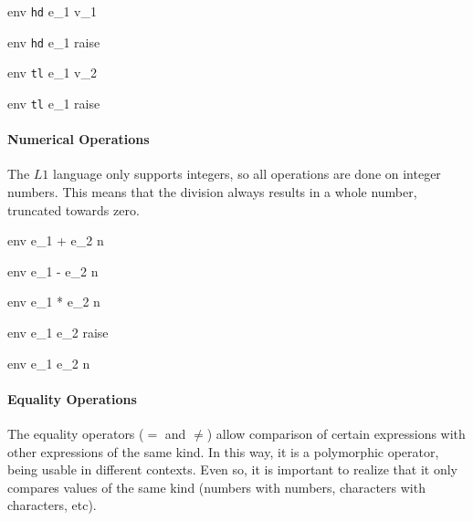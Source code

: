 \documentclass{article}
\begin{document}
    {\mbox{env} \vdash \texttt{hd} \; e_1 \Downarrow v_1}

    {\mbox{env} \vdash \texttt{hd} \; e_1 \Downarrow raise}

    {\mbox{env} \vdash \texttt{tl} \; e_1 \Downarrow v_2}

    {\mbox{env} \vdash \texttt{tl} \; e_1 \Downarrow raise}


\paragraph{Numerical Operations}
The $L1$ language only supports integers, so all operations are done on integer numbers.
This means that the division always results in a whole number, truncated towards zero.

\medskip

    {\mbox{env} \vdash e_1 + e_2 \Downarrow n}

    {\mbox{env} \vdash e_1 - e_2 \Downarrow n}

    {\mbox{env} \vdash e_1 * e_2 \Downarrow n}

    {\mbox{env} \vdash e_1 \div e_2 \Downarrow raise}

    {\mbox{env} \vdash e_1 \div e_2 \Downarrow n}

\paragraph{Equality Operations}
The equality operators ($=$ and $\neq$) allow comparison of certain expressions with other expressions of the same kind.
In this way, it is a polymorphic operator, being usable in different contexts.
Even so, it is important to realize that it only compares values of the same kind (numbers with numbers, characters with characters, etc).
\end{document}
